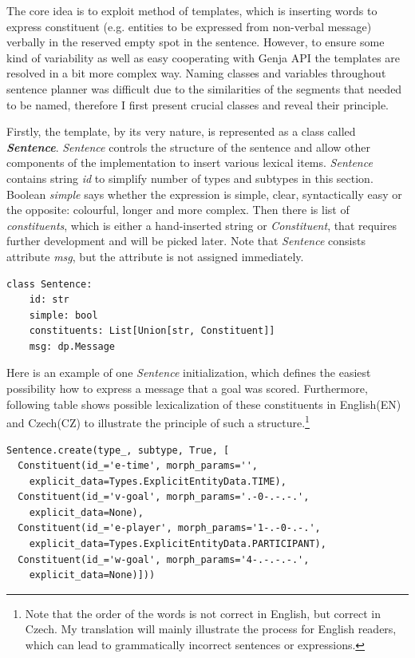 The core idea is to exploit method of templates, which is inserting words to express constituent (e.g. entities to be expressed from non-verbal message) verbally in the reserved empty spot in the sentence. However, to ensure some kind of variability as well as easy cooperating with Genja API the templates are resolved in a bit more complex way. Naming classes and variables throughout sentence planner was difficult due to the similarities of the segments that needed to be named, therefore I first present crucial classes and reveal their principle.

Firstly, the template, by its very nature, is represented as a class called \textit{\textbf{Sentence}}. \textit{Sentence} controls the structure of the sentence and allow other components of the implementation to insert various lexical items. \textit{Sentence} contains string \textit{id} to simplify number of types and subtypes in this section. Boolean \textit{simple} says whether the expression is simple, clear, syntactically easy or the opposite: colourful, longer and more complex. Then there is list of \textit{constituents}, which is either a hand-inserted string or \textit{Constituent}, that requires further development and will be picked later. Note that \textit{Sentence} consists attribute \textit{msg}, but the attribute is not assigned immediately.
\begin{Verbatim}[frame=single]
class Sentence:
	id: str
	simple: bool
	constituents: List[Union[str, Constituent]]
	msg: dp.Message
\end{Verbatim}
Here is an example of one \textit{Sentence} initialization, which defines the easiest possibility how to express a message that a goal was scored. Furthermore, following table shows possible lexicalization of these constituents in English(EN) and Czech(CZ) to illustrate the principle of such a structure.\footnote{Note that the order of the words is not correct in English, but correct in Czech. My translation will mainly illustrate the process for English readers, which can lead to grammatically incorrect sentences or expressions.}

\begin{Verbatim}[frame=single]
Sentence.create(type_, subtype, True, [
  Constituent(id_='e-time', morph_params='',
  	explicit_data=Types.ExplicitEntityData.TIME),
  Constituent(id_='v-goal', morph_params='.-0-.-.-.',
  	explicit_data=None),
  Constituent(id_='e-player', morph_params='1-.-0-.-.',
  	explicit_data=Types.ExplicitEntityData.PARTICIPANT),
  Constituent(id_='w-goal', morph_params='4-.-.-.-.',
  	explicit_data=None)]))
\end{Verbatim}

